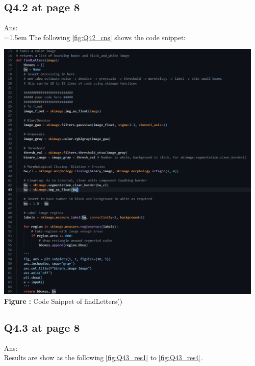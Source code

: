 \documentclass{article}
\begin{document}
	\newpage
	\subsection*{Q4.2 at page 8\texttt{}}
	Ans:\\
	\hangindent=1.5em \hspace{1.5em}The following \autoref{fig:Q42_cns} shows the code snippet:
	\newline

	\begin{minipage}{1\linewidth}
	\centering
	\hspace{0.12\linewidth} 
	\includegraphics[width=0.7\linewidth]{./Q42_cns.png}  %
	\newline
	\textbf{Figure \thefigure:} Code Snippet of findLetters() %
	\label{fig:Q42_cns}  %
	\end{minipage}	


	\newpage
	\subsection*{Q4.3 at page 8}
	Ans:\\
	Results are show as the following \autoref{fig:Q43_res1} to \autoref{fig:Q43_res4}.
\end{document}
